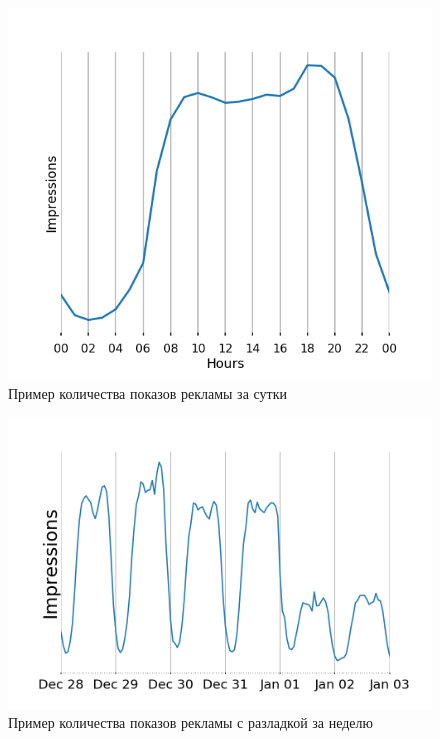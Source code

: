 \documentclass[%
12pt,
master,  %
natbib,      %
subf,        %
substylefile = spbu.rtx,
href,        %
colorlinks,  %
]{disser}
\begin{document}
\begin{figure}[!hhh]
	\begin{center}
		\includegraphics[width=12cm]{examples_day}
	\end{center}
	\vspace{-5mm}\caption{Пример количества показов рекламы за сутки}
	\label{fig:examples_day}
\end{figure}
 
\begin{figure}[!hhh]
	\begin{center}
		\includegraphics[width=12cm]{cp_mean_2}
	\end{center}
	\vspace{-5mm}\caption{Пример количества показов рекламы с разладкой за неделю}
	\label{fig:examples_month}
\end{figure}
\end{document}
